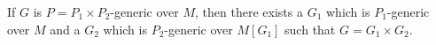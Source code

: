 If $G$ is $P = P_1 \times P_2$-generic over $M$, then there exists a $G_1$ which is $P_1$-generic over $M$ and a $G_2$ which is $P_2$-generic over $M[G_1]$ such that $G = G_1 \times G_2$.
